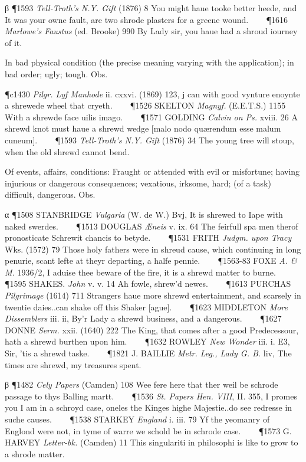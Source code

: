 \begin{description}[wide, labelwidth=!, labelindent=0pt]
\begin{myenumerate}
β \P 1593 \textit{Tell-Troth's  N.Y. Gift} (1876) 8 You might haue tooke better heede, and It was your owne fault, are two shrode plasters for a greene wound.    
\P 1616 \textit{Marlowe's  Faustus} (ed. Brooke) 990 By Lady sir, you haue had a shroud iourney of it.

 In bad physical condition (the precise meaning varying with the application); in bad order; ugly; tough. Obs.

\P c1430 \textit{Pilgr.  Lyf Manhode} ii. cxxvi. (1869) 123, j can with good vynture enoynte a shrewede wheel that cryeth.    
\P 1526 SKELTON \textit{Magnyf.} (E.E.T.S.) 1155 With  a shrewde face uilis imago.    
\P 1571 GOLDING  \textit{Calvin on Ps.} xviii. 26 A shrewd knot must haue a shrewd wedge [malo nodo quærendum esse malum cuneum].    
\P 1593 \textit{Tell-Troth's  N.Y. Gift} (1876) 34 The young tree will stoup, when the old shrewd cannot bend.

 Of events, affairs, conditions: Fraught or attended with evil or misfortune; having injurious or dangerous consequences; vexatious, irksome, hard; (of a task) difficult, dangerous. Obs.

α \P 1508 STANBRIDGE  \textit{Vulgaria} (W. de W.) Bvj, It is shrewed to Iape with naked swerdes.    
\P 1513 DOUGLAS  \textit{Æneis} v. ix. 64 The feirfull spa men therof pronosticate Schrewit chancis to betyde.    
\P 1531 FRITH  \textit{Judgm. upon Tracy} Wks. (1572) 79 Those holy fathers were in shreud cause, which continuing in long penurie, scant lefte at theyr departing, a halfe pennie.    
\P 1563-83 FOXE  \textit{A. \& M.} 1936/2, I aduise thee beware of the fire, it is a shrewd matter to burne.    
\P 1595 SHAKES.  \textit{John} v. v. 14 Ah fowle, shrew'd newes.    
\P 1613 PURCHAS  \textit{Pilgrimage} (1614) 711 Strangers haue more shrewd entertainment, and scarsely in twentie daies..can shake off this Shaker [ague].    
\P 1623 MIDDLETON  \textit{More Dissemblers} iii. ii, By'r Lady a shrewd business, and a dangerous.    
\P 1627 DONNE  \textit{Serm.} xxii. (1640) 222 The King, that comes after a good Predecessour, hath a shrewd burthen upon him.    
\P 1632 ROWLEY  \textit{New Wonder} iii. i. E3, Sir, 'tis a shrewd taske.    
\P 1821 J. BAILLIE  \textit{Metr. Leg., Lady G. B.} liv, The times are shrewd, my treasures spent.

β \P 1482 \textit{Cely  Papers} (Camden) 108 Wee fere here that ther weil be schrode passage to thys Balling martt.    
\P 1536 \textit{St. Papers  Hen. VIII}, II. 355, I promes you I am in a schroyd case, oneles the Kinges highe Majestie..do see redresse in suche causes.    
\P 1538 STARKEY  \textit{England} i. iii. 79 Yf the yeomanry of Englond were not, in tyme of warre we schold be in schrode case.    
\P 1573 G. HARVEY  \textit{Letter-bk.} (Camden) 11 This singulariti in philosophi is like to grow to a shrode matter.


\end{myenumerate}
\end{description}
